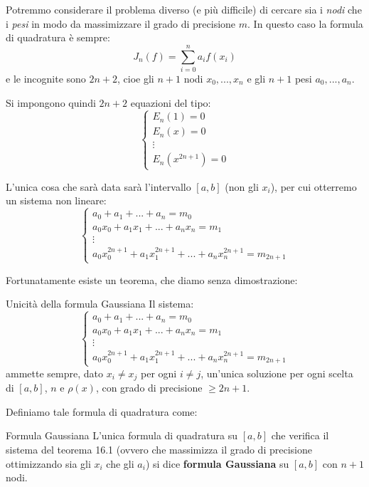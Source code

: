 \documentclass[a4paper,11pt]{article}
\begin{document}
\par\smallskip

Potremmo considerare il problema diverso (e più difficile) di cercare sia i \textit{nodi} che i \textit{pesi} in modo da massimizzare il grado di precisione $m$.
In questo caso la formula di quadratura è sempre:
$$
J_n(f) = \sum_{i = 0}^n a_i f(x_i)
$$
e le incognite sono $2n + 2$, cioe gli $n + 1$ nodi $x_0, ..., x_n$ e gli $n + 1$ pesi $a_0, ..., a_n$.

Si impongono quindi $2n + 2$ equazioni del tipo:
\[
	\begin{cases}
		E_n(1) = 0 \\
		E_n(x) = 0 \\
		\vdots \\
		E_n(x^{2n + 1}) = 0
	\end{cases}
\]

L'unica cosa che sarà data sarà l'intervallo $[a, b]$ (non gli $x_i$), per cui otterremo un sistema non lineare:
\[
	\begin{cases}
		a_0 + a_1 + ... + a_n = m_0 \\
		a_0 x_0 + a_1 x_1 + ... + a_n x_n = m_1 \\
		\vdots \\
		a_0 x_0^{2n + 1} + a_1 x_1^{2n + 1} + ... + a_n x_n^{2n + 1} = m_{2n + 1}
	\end{cases}
\]

Fortunatamente esiste un teorema, che diamo senza dimostrazione:
\begin{theorem}{Unicità della formula Gaussiana}
	Il sistema:
\[
	\begin{cases}
		a_0 + a_1 + ... + a_n = m_0 \\
		a_0 x_0 + a_1 x_1 + ... + a_n x_n = m_1 \\
		\vdots \\
		a_0 x_0^{2n + 1} + a_1 x_1^{2n + 1} + ... + a_n x_n^{2n + 1} = m_{2n + 1}
	\end{cases}
\]
ammette sempre, dato $x_i \neq x_j$ per ogni $i \neq j$, un'unica soluzione per ogni scelta di $[a, b]$, $n$ e $\rho(x)$, con grado di precisione $\geq 2n + 1$.
\end{theorem}

Definiamo tale formula di quadratura come:
\begin{definition}{Formula Gaussiana}
	L'unica formula di quadratura su $[a, b]$ che verifica il sistema del teorema 16.1 (ovvero che massimizza il grado di precisione ottimizzando sia gli $x_i$ che gli $a_i$) si dice \textbf{formula Gaussiana} su $[a, b]$ con $n + 1$ nodi.
\end{definition}
\end{document}
